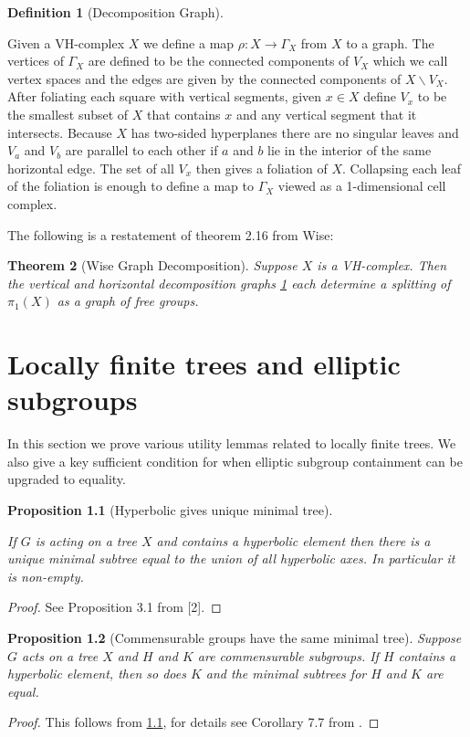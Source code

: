 \documentclass[12pt,parskip=full]{report}
\theoremstyle{plain}
\newtheorem{thm}{Theorem}[section]
\newtheorem{prop}[thm]{Proposition}
\theoremstyle{definition}
\newtheorem{dfn}[thm]{Definition}
\begin{document}
\begin{dfn}
    [Decomposition Graph]
    \label{dfn:decompositiongraph}
    
    Given a VH-complex \(X\) we define a map \(\rho: X\to \Gamma_X\) from \(X\) to a graph. The vertices of \(\Gamma_X\) are defined to be the connected components of \(V_X\) which we call vertex spaces and the edges are given by the connected components of \(X\smallsetminus V_X\). After foliating each square with vertical segments, given \(x\in X\) define \(V_x\) to be the smallest subset of \(X\) that contains \(x\) and any vertical segment that it intersects. Because \(X\) has two-sided hyperplanes there are no singular leaves and \(V_a\) and \(V_b\) are parallel to each other if \(a\) and \(b\) lie in the interior of the same horizontal edge. The set of all \(V_x\) then gives a foliation of \(X\). Collapsing each leaf of the foliation is enough to define a map to \(\Gamma_X\) viewed as a 1-dimensional cell complex. 
\end{dfn}

The following is a restatement of theorem 2.16 \cite{wisethesis} from Wise:
\begin{thm}[Wise Graph Decomposition]
\label{thm:wisegraph}
Suppose \(X\) is a VH-complex. Then the vertical and horizontal decomposition graphs \ref{dfn:decompositiongraph} each determine a splitting of \(\pi_1(X)\) as a graph of free groups. 
\end{thm}

\chapter{Locally finite trees and elliptic subgroups}

In this section we prove various utility lemmas related to locally finite trees. We also give a key sufficient condition for when elliptic subgroup containment can be upgraded to equality.

\begin{prop}
    [Hyperbolic gives unique minimal tree]
    \label{pro:uniquemintree}
    
    If $G$ is acting on a tree $X$ and contains a hyperbolic element then there is a unique minimal subtree equal to the union of all hyperbolic axes. In particular it is non-empty.
\end{prop}
\begin{proof}
See Proposition 3.1 from [2].
\end{proof}
\begin{prop}
    [Commensurable groups have the same minimal tree]
    \label{pro:commintree}
    Suppose $G$ acts on a tree $X$ and $H$ and $K$ are commensurable subgroups. If $H$ contains a hyperbolic element, then so does $K$ and the minimal subtrees for $H$ and $K$ are equal.
\end{prop}
\begin{proof}
    This follows from \ref{pro:uniquemintree}, for details see Corollary 7.7 from \cite{hymanbass}.
\end{proof}
\end{document}
